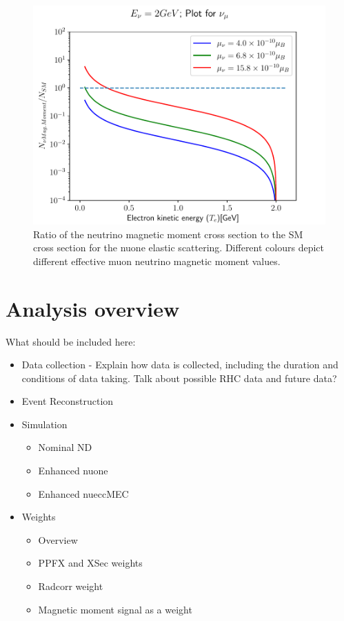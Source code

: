 \begin{figure}[hbtp]
\centering
\includegraphics[width=.9\textwidth]{Plots/NuMM/RatioNumuMMCompLinX.pdf}
\caption[Ratio of the neutrino magnetic moment and Standard Model cross sections]{Ratio of the neutrino magnetic moment cross section to the \acrshort{SM} cross section for the \acrshort{nuone} elastic scattering. Different colours depict different effective muon neutrino magnetic moment values.}
\label{fig:NuMMCrossSectionRatios}
\end{figure}

\section{Analysis overview}\label{sec:NuMMAnalysisOverview}

What should be included here:
\begin{itemize}
\item Data collection - Explain how data is collected, including the duration and conditions of data taking. Talk about possible RHC data and future data?
\item Event Reconstruction
\item Simulation
\begin{itemize}
\item Nominal ND
\item Enhanced nuone
\item Enhanced nueccMEC
\end{itemize}
\item Weights
\begin{itemize}
\item Overview
\item PPFX and XSec weights
\item Radcorr weight
\item Magnetic moment signal as a weight
\end{itemize}
\end{itemize}

